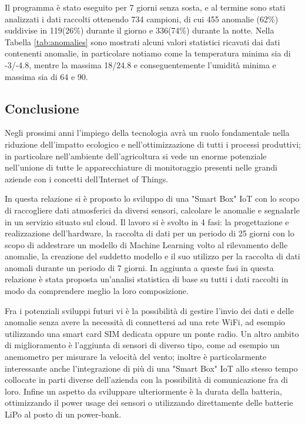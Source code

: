 \documentclass[a4paper, 12pt]{report}
\begin{document}
Il programma è stato eseguito per 7 giorni senza sosta, e al termine sono stati analizzati i dati raccolti ottenendo 734 campioni, di cui 455 anomalie (62\%) suddivise in 119(26\%) durante il giorno e 336(74\%) 
durante la notte. Nella Tabella \ref{tab:anomalies} sono mostrati alcuni valori statistici ricavati dai dati contenenti anomalie, in particolare notiamo come la temperatura minima sia di -3/-4.8, mentre la 
massima 18/24.8 e conseguentemente l'umidità minima e massima sia di 64 e 90.

\subsection*{Conclusione}
\vspace{0.5cm}

Negli prossimi anni l'impiego della tecnologia avrà un ruolo fondamentale nella riduzione dell'impatto ecologico e nell'ottimizzazione di tutti i processi produttivi; in particolare nell'ambiente dell'agricoltura
si vede un enorme potenziale nell'unione di tutte le apparecchiature di monitoraggio presenti nelle grandi aziende con i concetti dell'Internet of Things. 

In questa relazione si è proposto lo sviluppo di una "Smart Box" IoT con lo scopo di raccogliere dati atmosferici da diversi sensori, calcolare le anomalie e segnalarle in un servizio situato sul cloud. 
Il lavoro si è svolto in 4 fasi: la progettazione e realizzazione dell'hardware, la raccolta di dati per un periodo di 25 giorni con lo scopo di addestrare un modello di Machine Learning volto al rilevamento delle 
anomalie, la creazione del suddetto modello e il suo utilizzo per la raccolta di dati anomali durante un periodo di 7 giorni. 
In aggiunta a queste fasi in questa relazione è stata proposta un'analisi statistica di base su tutti i dati raccolti in modo da comprendere meglio la loro composizione.

Fra i potenziali sviluppi futuri vi è la possibilità di gestire l'invio dei dati e delle anomalie senza avere la necessità di connettersi ad una rete WiFi, ad esempio utilizzando una smart card SIM dedicata oppure 
un ponte radio. Un altro ambito di miglioramento è l'aggiunta di sensori di diverso tipo, come ad esempio un anemometro per misurare la velocità del vento; inoltre è particolarmente interessante anche l'integrazione di 
più di una "Smart Box" IoT allo stesso tempo collocate in parti diverse dell'azienda con la possibilità di comunicazione fra di loro. 
Infine un aspetto da sviluppare ulteriormente è la durata della batteria, ottimizzando il power usage dei sensori o utilizzando direttamente delle batterie LiPo al posto di un power-bank.

\printbibliography
\end{document}

